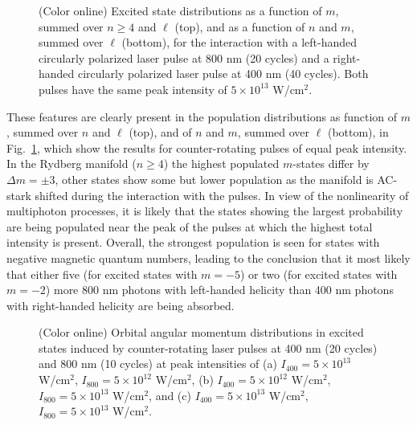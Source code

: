 \begin{figure}[h!]
\caption{\label{fig:nm-counter-distribution}
(Color online) 
Excited state distributions as a function of $m$, summed over $n \ge 4$ and $\ell$ (top), and as a function of $n$ and $m$, summed over $\ell$ (bottom), for the interaction with a left-handed circularly polarized laser pulse at 800 nm (20 cycles) and a right-handed circularly polarized laser pulse at 400 nm (40 cycles). Both pulses have the same peak intensity of $5 \times 10^{13}$ W/cm$^2$.
}
\end{figure}

These features are clearly present in the population distributions as function of $m$, summed over $n$ and $\ell$ (top), and of $n$ and $m$, summed over $\ell$ (bottom), in Fig.\ \ref{fig:nm-counter-distribution}, which show the results for counter-rotating pulses of equal peak intensity. In the Rydberg manifold ($n \ge 4$) the highest populated $m$-states differ by $\Delta m = \pm 3$, other states show some but lower population as the manifold is AC-stark shifted during the interaction with the pulses. In view of the nonlinearity of multiphoton processes, it is likely that the states showing the largest probability are being populated near the peak of the pulses at which the highest total intensity is present. Overall, the strongest population is seen for states with negative magnetic quantum numbers, leading to the conclusion that it most likely that either five (for excited states with $m = -5$) or two (for excited states with $m = -2$) more 800 nm photons with left-handed helicity than 400 nm photons with right-handed helicity are being absorbed.    


\begin{figure}[h!]
\centering
\caption{\label{fig:angular}
(Color online) 
Orbital angular momentum distributions in excited states induced by counter-rotating laser pulses at 400 nm (20 cycles) and 800 nm (10 cycles) at peak intensities of (a) $I_{400} =  5 \times 10^{13}$ W/cm$^2$, $I_{800} = 5 \times 10^{12}$ W/cm$^2$, (b) $I_{400} = 5 \times 10^{12}$ W/cm$^2$, $I_{800} =  5 \times 10^{13}$ W/cm$^2$, and (c) $I_{400} = 5 \times 10^{13}$ W/cm$^2$, $I_{800} = 5 \times 10^{13}$ W/cm$^2$.
}
\end{figure}

